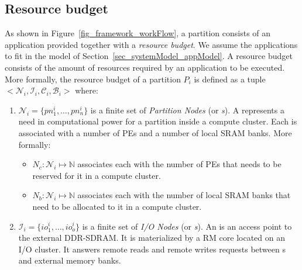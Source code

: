 \documentclass[main.tex]{subfiles}
\begin{document}
\subsection{Resource budget}
\label{ssec_framework_partitionModel}
As shown in Figure~\ref{fig_framework_workFlow}, a partition consists of an application provided together with a \emph{resource budget}. We assume the applications to fit in the model of Section~\ref{sec_systemModel_appModel}. A resource budget consists of the amount of resources required by an application to be executed. More formally, the resource budget of a partition $P_i$ is defined as a tuple $<\mathcal{N}_i, \mathcal{I}_i, \mathcal{C}_i, \mathcal{B}_i>$ where:
    \begin{enumerate}
        \item $\mathcal{N}_i = \{ pn_1^i , \ldots , pn_n^i \}$ is a finite set of \emph{Partition Nodes} (or \emph{\PN{}s}). A \PN{} represents a need in computational power for a partition inside a compute cluster. Each \PN{} is associated with a number of PEs and a number of local SRAM banks. More formally: 
            \begin{itemize}
                \item $N_c : \mathcal{N}_i \mapsto \mathbb{N}$ associates each \PN{} with the number of PEs that needs to be reserved for it in a compute cluster.
                \item $N_b : \mathcal{N}_i \mapsto \mathbb{N}$ associates each \PN{} with the number of local SRAM banks that need to be allocated to it in a compute cluster.
            \end{itemize}

        \item  $\mathcal{I}_i = \{ io_1^i , \ldots , io_o^i \}$ is a finite set of \emph{I/O Nodes} (or \emph{\ION{}s}). An \ION{} is an access point to the external DDR-SDRAM. It is materialized by a RM core located on an I/O cluster. It answers remote reads and remote writes requests between \PN{}s and external memory banks.
    

\end{enumerate}
\end{document}
